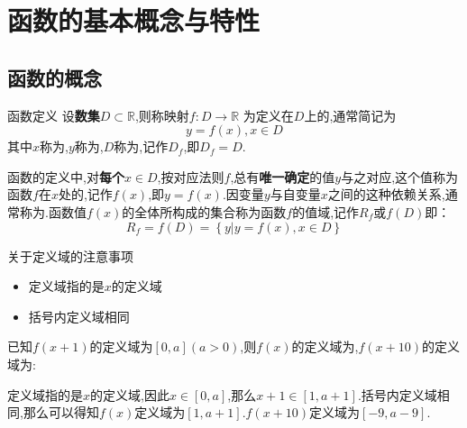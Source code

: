 \documentclass[12pt, a4paper, oneside, UTF8]{ctexbook}  %
\begin{document}
\begin{sloppypar}
    \section{函数的基本概念与特性}
    \subsection{函数的概念}
    \begin{defn}{函数定义}{}
        设\textbf{数集}$D \subset \mathbb{R}$,则称映射$f:D \to \mathbb{R}$ 为定义在$D$上的,通常简记为
        $$
            y=f(x),x \in D
        $$
        其中$x$称为,$y$称为,$D$称为,记作$D_f$,即$D_f=D$.
    \end{defn}
    函数的定义中,对\textbf{每个}$x \in D$,按对应法则$f$,总有\textbf{唯一确定}的值$y$与之对应,这个值称为函数$f$在$x$处的,记作$f(x)$,即$y=f(x)$.因变量$y$与自变量$x$之间的这种依赖关系,通常称为.函数值$f(x)$的全体所构成的集合称为函数$f$的值域,记作$R_f$或$f(D)$即：
    $$
        R_{f}=f(D)=\left\{y|y=f(x),x\in D\right\}
    $$
    \begin{criterion}{关于定义域的注意事项}{}
        \begin{itemize}
            \item 定义域指的是$x$的定义域
            \item 括号内定义域相同
        \end{itemize}
        \begin{problem}
        已知$f(x+1)$的定义域为$[0,a](a>0)$,则$f(x)$的定义域为,$f(x+10)$的定义域为:
        \end{problem}
        \begin{solution}
            定义域指的是$x$的定义域,因此$x \in [0,a]$,那么$x+1 \in [1,a+1]$.括号内定义域相同,那么可以得知$f(x)$定义域为$[1,a+1]$.$f(x+10)$定义域为$[-9,a-9]$.
        \end{solution}
    \end{criterion}

\end{sloppypar}
\end{document}

